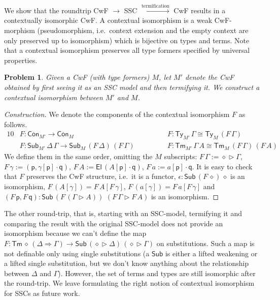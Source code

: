 \documentclass[submission,copyright,creativecommons]{eptcs}
\newtheorem{problem}[theorem]{Problem}
\newcommand{\ra}{\rightarrow}
\newcommand{\Ra}{\Rightarrow}
\newcommand{\Ty}{\mathsf{Ty}}
\newcommand{\Tm}{\mathsf{Tm}}
\newcommand{\Con}{\mathsf{Con}}
\newcommand{\Sub}{\mathsf{Sub}}
\newcommand{\p}{\mathsf{p}}
\newcommand{\q}{\mathsf{q}}
\newcommand{\ext}{\mathop{\triangleright}}
\newcommand{\U}{\mathsf{U}}
\newcommand{\El}{\mathsf{El}}
\begin{document}
We show that the roundtrip CwF $\longrightarrow$ SSC
$\xrightarrow{\text{termification}}$ CwF results in a contextually
isomorphic CwF. A contextual isomorphism
\cite{DBLP:journals/corr/abs-2211-07487} is a weak CwF-morphism
(pseudomorphism, i.e.\ context extension and the empty context are
only preserved up to isomorphism) which is bijective on types and
terms. Note that a contextual isomorphism preserves all type formers
specified by universal properties.
\begin{problem}
  Given a CwF (with type formers) $M$, let $M'$ denote the CwF
  obtained by first seeing it as an SSC model and then termifying it. We
  construct a contextual isomorphism between $M'$ and $M$.
\end{problem}
\begin{proof}[Construction]
  We denote the components of the contextual isomorphism $F$ as follows.
  \begin{alignat*}{10}
    & F : \Con_{M'}\ra\Con_M && F : \Ty_{M'}\,\Gamma \cong \Ty_M\,(F\,\Gamma) \\
    & F : \Sub_{M'}\,\Delta\,\Gamma\ra\Sub_M\,(F\,\Delta)\,(F\,\Gamma)\hspace{3em} && F : \Tm_{M'}\,\Gamma\,A \cong \Tm_M\,(F\,\Gamma)\,(F\,A)
  \end{alignat*}
  We define them in the same order, omitting the $M$ subscripts:
  $F\,\Gamma := \diamond\ext\Gamma$, 
  $F\,\gamma := (\p,\gamma[\p]\cdot\q)$, 
  $F\,A := \El\,(A[\p]\cdot\q)$, 
  $F\,a := a[\p]\cdot\q$.
  It is easy to check that $F$ preserves the CwF structure, i.e.\ it
  is a functor, $\epsilon : \Sub\,(F\,\diamond)\,\diamond$ is an
  isomorphism, $F\,(A[\gamma]) = F\,A[F\,\gamma]$, $F\,(a[\gamma]) =
  F\,a[F\,\gamma]$ and $(F\,\p,F\,\q) : \Sub\,(F\,(\Gamma\ext
  A))$ $(F\,\Gamma\ext F\,A)$ is an isomorphism. %
\end{proof}
The other round-trip, that is, starting with an SSC-model, termifying
it and comparing the result with the original SSC-model does not provide an
isomorphism because we can't define the map $F :
\Tm\,\diamond\,(\Delta\Ra\Gamma) \ra
\Sub\,(\diamond\ext\Delta)\,(\diamond\ext\Gamma)$ on
substitutions. Such a map is not definable only using single
substitutions (a $\Sub$ is either a lifted weakening or a lifted single substitution, but we don't know anything about the relationship between $\Delta$ and $\Gamma$). However, the set of terms and types are still
isomorphic after the round-trip. We leave formulating the right notion
of contextual isomorphism for SSCs as future work.
\end{document}

